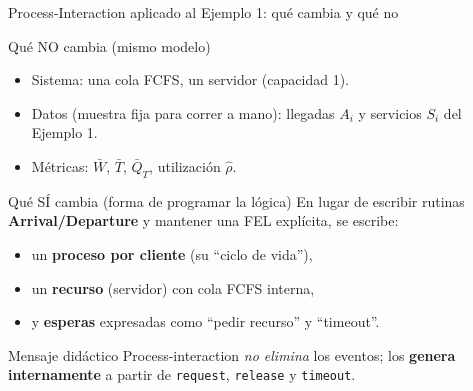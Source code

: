 \documentclass[aspectratio=1610, 9pt]{beamer}
\begin{document}
\begin{frame}{Process-Interaction aplicado al Ejemplo 1: qué cambia y qué no}
\small
\begin{block}{Qué NO cambia (mismo modelo)}
\begin{itemize}
\item Sistema: una cola FCFS, un servidor (capacidad 1).
\item Datos (muestra fija para correr a mano): llegadas $A_i$ y servicios $S_i$ del Ejemplo 1.
\item Métricas: $\bar W$, $\bar T$, $\bar Q_T$, utilización $\hat\rho$.
\end{itemize}
\end{block}

\vspace{4pt}
\begin{block}{Qué SÍ cambia (forma de programar la lógica)}
En lugar de escribir rutinas \textbf{Arrival/Departure} y mantener una FEL explícita, se escribe:
\begin{itemize}
\item un \textbf{proceso por cliente} (su “ciclo de vida”),
\item un \textbf{recurso} (servidor) con cola FCFS interna,
\item y \textbf{esperas} expresadas como “pedir recurso” y “timeout”.
\end{itemize}
\end{block}

\vspace{4pt}
\begin{alertblock}{Mensaje didáctico}
Process-interaction \emph{no elimina} los eventos; los \textbf{genera internamente} a partir de \texttt{request}, \texttt{release} y \texttt{timeout}.
\end{alertblock}
\end{frame}
\end{document}
